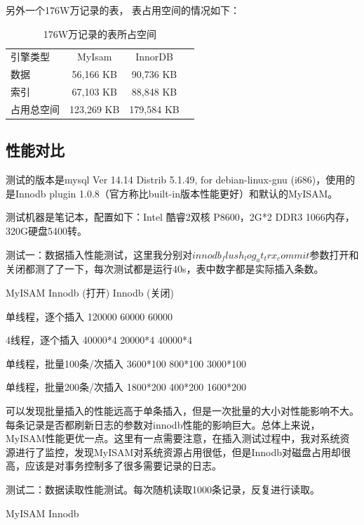 \documentclass[UTF8]{ctexart}
\begin{document}
另外一个176W万记录的表， 表占用空间的情况如下：
\begin{table}[]
\caption{176W万记录的表所占空间}
\vspace{20pt}
\centering
\begin{tabular}{|l|c|c|c|}
\hline
引擎类型        &        MyIsam &             InnorDB\\
数据           &       56,166 KB    &      90,736 KB\\
索引           &       67,103 KB   &       88,848 KB\\
占用总空间      &  123,269 KB     &   179,584 KB\\
 \hline       
 \end{tabular}
 \label{bs5}
\end{table}
\subsection{性能对比}
测试的版本是mysql  Ver 14.14 Distrib 5.1.49, for debian-linux-gnu (i686)，使用的是Innodb plugin 1.0.8（官方称比built-in版本性能更好）和默认的MyISAM。

测试机器是笔记本，配置如下：Intel 酷睿2双核 P8600，2G*2 DDR3 1066内存，320G硬盘5400转。

测试一：数据插入性能测试，这里我分别对$innodb_flush_log_at_trx_commit$参数打开和关闭都测了了一下，每次测试都是运行40s，表中数字都是实际插入条数。

 
                      MyISAM                 Innodb (打开)      Innodb
 (关闭)

单线程，逐个插入         120000                 60000              60000

4线程，逐个插入          40000*4
                20000*4
            40000*4

单线程，批量100条/次插入  3600*100
               800*100            3000*100

单线程，批量200条/次插入  1800*200
               400*200            1600*200

可以发现批量插入的性能远高于单条插入，但是一次批量的大小对性能影响不大。每条记录是否都刷新日志的参数对innodb性能的影响巨大。总体上来说，MyISAM性能更优一点。这里有一点需要注意，在插入测试过程中，我对系统资源进行了监控，发现MyISAM对系统资源占用很低，但是Innodb对磁盘占用却很高，应该是对事务控制多了很多需要记录的日志。

测试二：数据读取性能测试。每次随机读取1000条记录，反复进行读取。

 
                       MyISAM        Innodb
\end{document}
